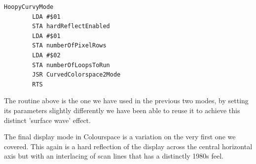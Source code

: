 \begin{lstlisting}
HoopyCurvyMode   
        LDA #$01
        STA hardReflectEnabled
        LDA #$01
        STA numberOfPixelRows
        LDA #$02
        STA numberOfLoopsToRun
        JSR CurvedColorspace2Mode
        RTS 
\end{lstlisting}

The routine  above is the one we have used in the previous two modes, by setting
its parameters slightly differently we have been able to reuse it to achieve this distinct 'surface wave' effect.

The final display mode in Colourspace is a variation on the very first one we covered. This again is a hard reflection
of the display across the central horizontal axis but with an interlacing of scan lines that has a distinctly 1980s feel.

%
%
\clearpage
